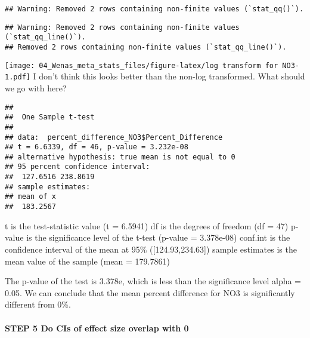 \documentclass[
]{article}
\newenvironment{Shaded}{\begin{snugshade}}{\end{snugshade}}
\newcommand{\AttributeTok}[1]{\textcolor[rgb]{0.77,0.63,0.00}{#1}}
\newcommand{\CommentTok}[1]{\textcolor[rgb]{0.56,0.35,0.01}{\textit{#1}}}
\newcommand{\DecValTok}[1]{\textcolor[rgb]{0.00,0.00,0.81}{#1}}
\newcommand{\FunctionTok}[1]{\textcolor[rgb]{0.00,0.00,0.00}{#1}}
\newcommand{\NormalTok}[1]{#1}
\newcommand{\OtherTok}[1]{\textcolor[rgb]{0.56,0.35,0.01}{#1}}
\newcommand{\SpecialCharTok}[1]{\textcolor[rgb]{0.00,0.00,0.00}{#1}}
\begin{document}
\begin{verbatim}
## Warning: Removed 2 rows containing non-finite values (`stat_qq()`).
\end{verbatim}

\begin{verbatim}
## Warning: Removed 2 rows containing non-finite values (`stat_qq_line()`).
## Removed 2 rows containing non-finite values (`stat_qq_line()`).
\end{verbatim}

\texttt{[image: 04\_Wenas\_meta\_stats\_files/figure-latex/log transform for NO3-1.pdf]}
I don't think this looks better than the non-log transformed. What
should we go with here?

\begin{Shaded}
\end{Shaded}

\begin{verbatim}
## 
##  One Sample t-test
## 
## data:  percent_difference_NO3$Percent_Difference
## t = 6.6339, df = 46, p-value = 3.232e-08
## alternative hypothesis: true mean is not equal to 0
## 95 percent confidence interval:
##  127.6516 238.8619
## sample estimates:
## mean of x 
##  183.2567
\end{verbatim}

t is the test-statistic value (t = 6.5941) df is the degrees of freedom
(df = 47) p-value is the significance level of the t-test (p-value =
3.378e-08) conf.int is the confidence interval of the mean at 95\%
({[}124.93,234.63{]}) sample estimates is the mean value of the sample
(mean = 179.7861)

The p-value of the test is 3.378e, which is less than the significance
level alpha = 0.05. We can conclude that the mean percent difference for
NO3 is significantly different from 0\%.

\hypertarget{step-5-do-cis-of-effect-size-overlap-with-0}{%
\paragraph{STEP 5 Do CIs of effect size overlap with
0}\label{step-5-do-cis-of-effect-size-overlap-with-0}}
\end{document}
